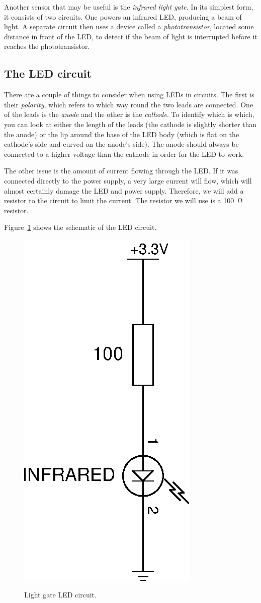\documentclass{article}
\begin{document}

Another sensor that may be useful is the \emph{infrared light gate}. In its
simplest form, it consists of two circuits. One powers an infrared LED,
producing a beam of light. A separate circuit then uses a device called a
\emph{phototransistor}, located some distance in front of the LED, to detect if
the beam of light is interrupted before it reaches the phototransistor.

\subsection{The LED circuit}

There are a couple of things to consider when using LEDs in circuits. The first
is their \emph{polarity}, which refers to which way round the two leads are
connected. One of the leads is the \emph{anode} and the other is the
\emph{cathode}. To identify which is which, you can look at either the length of
the leads (the cathode is slightly shorter than the anode) or the lip around the
base of the LED body (which is flat on the cathode's side and curved on the
anode's side). The anode should always be connected to a higher voltage than the
cathode in order for the LED to work.

The other issue is the amount of current flowing through the LED. If it was
connected directly to the power supply, a very large current will flow, which
will almost certainly damage the LED and power supply. Therefore, we will add a
resistor to the circuit to limit the current. The resistor we will use is a
\SI{100}{\ohm} resistor.

Figure~\ref{fig:schem:ir-led} shows the schematic of the LED circuit.

\begin{figure}[h]
\centering
\includegraphics[width=.5\textwidth]{assets/fig/schem/ir-led}
\label{fig:schem:ir-led}
\caption{Light gate LED circuit.}
\end{figure}
\end{document}
